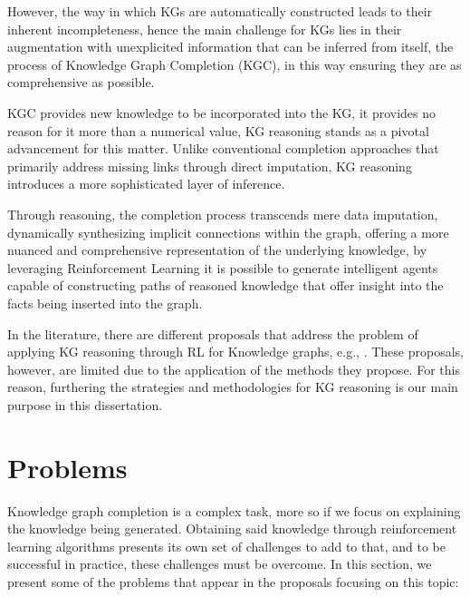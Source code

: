 However, the way in which KGs are automatically constructed leads to their inherent incompleteness, hence the main challenge for KGs lies in their augmentation with unexplicited information that can be inferred from itself, the process of Knowledge Graph Completion (KGC), in this way ensuring they are as comprehensive as possible.

KGC provides new knowledge to be incorporated into the KG, it provides no reason for it more than a numerical value, KG reasoning stands as a pivotal advancement for this matter. Unlike conventional completion approaches that primarily address missing links through direct imputation, KG reasoning introduces a more sophisticated layer of inference.

Through reasoning, the completion process transcends mere data imputation, dynamically synthesizing implicit connections within the graph, offering a more nuanced and comprehensive representation of the underlying knowledge, by leveraging Reinforcement Learning it is possible to generate intelligent agents capable of constructing paths of reasoned knowledge that offer insight into the facts being inserted into the graph.

In the literature, there are different proposals that address the problem of
applying KG reasoning through RL for Knowledge graphs, e.g., \cite{}. These proposals, however, are limited due to the application of the methods they propose. For this reason, furthering the strategies and methodologies for KG reasoning is our main purpose in this dissertation.

\section{Problems}\label{sec:moti-problems}
Knowledge graph completion is a complex task, more so if we focus on explaining the knowledge being generated. Obtaining said knowledge through reinforcement learning algorithms presents its own set of challenges to add to that, and to be successful in practice, these challenges must be overcome. In this section, we present some of the problems that appear in the proposals focusing on this topic:

